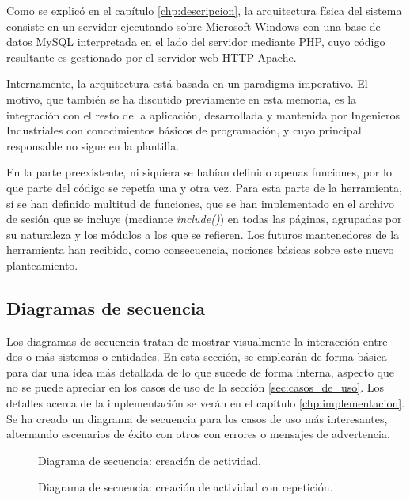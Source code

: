 Como se explicó en el capítulo \ref{chp:descripcion}, la arquitectura física del
sistema consiste en un servidor ejecutando sobre Microsoft Windows con una base
de datos MySQL interpretada en el lado del servidor mediante PHP, cuyo código
resultante es gestionado por el servidor web HTTP Apache.

Internamente, la arquitectura está basada en un paradigma imperativo. El
motivo, que también se ha discutido previamente en esta memoria, es la
integración con el resto de la aplicación, desarrollada y mantenida por
Ingenieros Industriales con conocimientos básicos de programación, y cuyo
principal responsable no sigue en la plantilla.

En la parte preexistente, ni siquiera se habían definido apenas funciones, por
lo que parte del código se repetía una y otra vez. Para esta parte de la
herramienta, sí se han definido multitud de funciones, que se han implementado
en el archivo de sesión que se incluye (mediante \textit{include()}) en todas
las páginas, agrupadas por su naturaleza y los módulos a los que se refieren.
Los futuros mantenedores de la herramienta han recibido, como consecuencia,
nociones básicas sobre este nuevo planteamiento.


\subsection{Diagramas de secuencia}

Los diagramas de secuencia tratan de mostrar visualmente la interacción entre
dos o más sistemas o entidades. En esta sección, se emplearán de forma básica
para dar una idea más detallada de lo que sucede de forma interna, aspecto que
no se puede apreciar en los casos de uso de la sección \ref{sec:casos_de_uso}.
Los detalles acerca de la implementación se verán en el capítulo
\ref{chp:implementacion}. Se ha creado un diagrama de secuencia para los casos
de uso más interesantes, alternando escenarios de éxito con otros con errores o
mensajes de advertencia.

\begin{figure}
\centering
{}
\caption{Diagrama de secuencia: creación de actividad.}
\label{fig:crear_actividad}
\end{figure}

\begin{figure}
\centering
{}
\caption{Diagrama de secuencia: creación de actividad con repetición.}
\label{fig:crear_actividad_repetida}
\end{figure}

